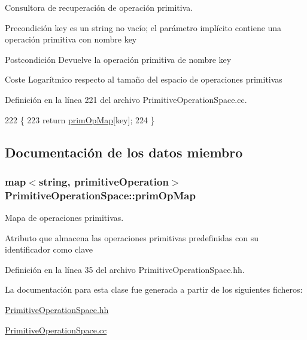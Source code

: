 Consultora de recuperación de operación primitiva. 

\begin{DoxyPrecond}{Precondición}
\textquotesingle{}key\textquotesingle{} es un string no vacío; el parámetro implícito contiene una operación primitiva con nombre \textquotesingle{}key\textquotesingle{} 
\end{DoxyPrecond}
\begin{DoxyPostcond}{Postcondición}
Devuelve la operación primitiva de nombre \textquotesingle{}key\textquotesingle{} 
\end{DoxyPostcond}
\begin{DoxyParagraph}{Coste}
Logarítmico respecto al tamaño del espacio de operaciones primitivas 
\end{DoxyParagraph}


Definición en la línea 221 del archivo Primitive\+Operation\+Space.\+cc.


\begin{DoxyCode}
222 \{
223   \textcolor{keywordflow}{return} \hyperlink{class_primitive_operation_space_afd359615001ed1e9b44b9618287834ec}{primOpMap}[key];
224 \}
\end{DoxyCode}


\subsection{Documentación de los datos miembro}
\subsubsection[{\texorpdfstring{prim\+Op\+Map}{primOpMap}}]{\setlength{\rightskip}{0pt plus 5cm}map$<$string, {\bf primitive\+Operation}$>$ Primitive\+Operation\+Space\+::prim\+Op\+Map\hspace{0.3cm}{\ttfamily [private]}}\hypertarget{class_primitive_operation_space_afd359615001ed1e9b44b9618287834ec}{}\label{class_primitive_operation_space_afd359615001ed1e9b44b9618287834ec}


Mapa de operaciones primitivas. 

Atributo que almacena las operaciones primitivas predefinidas con su identificador como clave 

Definición en la línea 35 del archivo Primitive\+Operation\+Space.\+hh.



La documentación para esta clase fue generada a partir de los siguientes ficheros\+:\begin{DoxyCompactItemize}
\item 
\hyperlink{_primitive_operation_space_8hh}{Primitive\+Operation\+Space.\+hh}\item 
\hyperlink{_primitive_operation_space_8cc}{Primitive\+Operation\+Space.\+cc}\end{DoxyCompactItemize}
